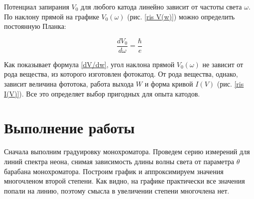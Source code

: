 \documentclass[12pt]{kiarticle} %
\begin{document}
    Потенциал запирания $ V_0 $ для любого катода линейно зависит от
    частоты света $ \omega $. По наклону прямой на графике $ V_0(\omega) $ (рис. \ref{ris V(w)}) можно определить постоянную Планка:
    
    \begin{equation}\label{dV/dw}
    \dfrac{dV_0}{d\omega} = \dfrac{\hbar}{e}
    \end{equation}
    
    Как показывает формула \eqref{dV/dw}, угол наклона прямой $ V_0(\omega) $ не зависит от рода вещества, из которого изготовлен фотокатод. От рода вещества, однако, зависит величина фототока, работа выхода $ W $ и форма кривой $ I(V) $ (рис. \ref{ris I(V)}). Все это определяет выбор пригодных для
    опыта катодов.


    
    
    \section{Выполнение работы}
    
    Сначала выполним градуировку монохроматора. Проведем серию измерений для линий спектра неона, 
    снимая зависимость длины волны света от параметра $ \theta $ барабана монохроматора.
    Построим график и аппроксимируем значения многочленом второй степени.
    Как видно, на графике практически все значения попали на линию, поэтому смысла в увеличении степени многочлена нет.
\end{document}
